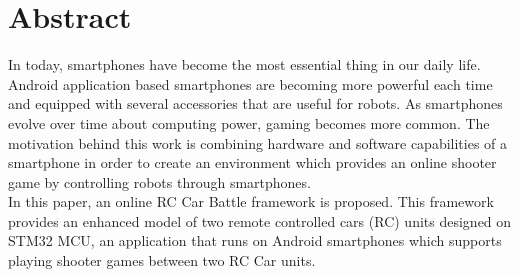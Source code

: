 \chapter*{Abstract}

In today, smartphones have become the most essential thing in our daily life. Android application based smartphones are becoming more powerful each time and equipped with several accessories that are useful for robots. As smartphones evolve over time about computing power, gaming becomes more common. The motivation behind this work is combining hardware and software capabilities of a smartphone in order to create an environment which provides an online shooter game by controlling robots through smartphones.\\ 

In this paper, an online RC Car Battle framework is proposed. This framework provides an enhanced model of two remote controlled cars (RC) units designed on STM32 MCU, an application that runs on Android smartphones which supports playing shooter games between two RC Car units. 
\vfill
\clearpage